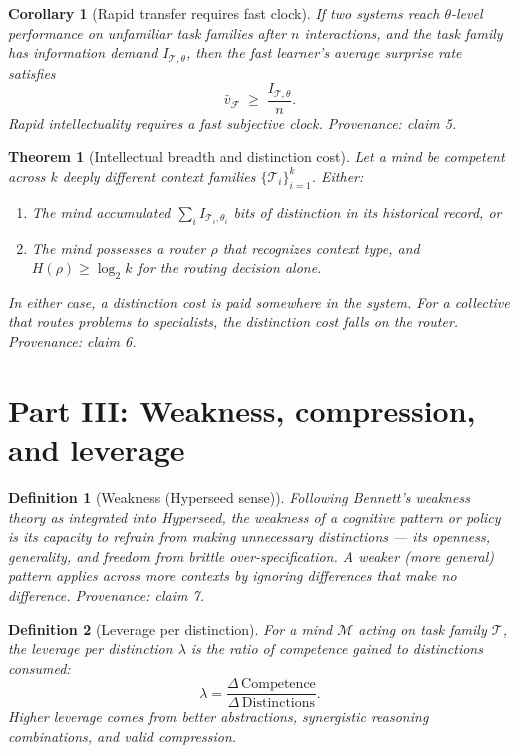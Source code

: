 \documentclass[11pt]{article}
\newtheorem{definition}{Definition}
\newtheorem{theorem}{Theorem}
\newtheorem{corollary}{Corollary}
\begin{document}
\begin{corollary}[Rapid transfer requires fast clock]
\label{cor:transfer}
If two systems reach $\theta$-level performance on unfamiliar task families after $n$ interactions, and the task family has information demand $I_{\mathcal{T},\theta}$, then the fast learner's average surprise rate satisfies
\[
  \bar{v}_{\mathcal{F}} \;\geq\; \frac{I_{\mathcal{T},\theta}}{n}.
\]
Rapid intellectuality requires a fast subjective clock.
\emph{Provenance: claim 5.}
\end{corollary}

\begin{theorem}[Intellectual breadth and distinction cost]
\label{thm:breadth}
Let a mind be competent across $k$ deeply different context families $\{\mathcal{T}_i\}_{i=1}^k$. Either:
\begin{enumerate}
  \item[(a)] The mind accumulated $\sum_i I_{\mathcal{T}_i,\theta_i}$ bits of distinction in its historical record, or
  \item[(b)] The mind possesses a router $\rho$ that recognizes context type, and $H(\rho) \geq \log_2 k$ for the routing decision alone.
\end{enumerate}
In either case, a distinction cost is paid somewhere in the system. For a collective that routes problems to specialists, the distinction cost falls on the router.
\emph{Provenance: claim 6.}
\end{theorem}

\section{Part III: Weakness, compression, and leverage}

\begin{definition}[Weakness (Hyperseed sense)]
\label{def:weakness}
Following Bennett's weakness theory as integrated into Hyperseed, the \emph{weakness} of a cognitive pattern or policy is its capacity to refrain from making unnecessary distinctions --- its openness, generality, and freedom from brittle over-specification. A weaker (more general) pattern applies across more contexts by ignoring differences that make no difference.
\emph{Provenance: claim 7.}
\end{definition}

\begin{definition}[Leverage per distinction]
\label{def:leverage}
For a mind $\mathcal{M}$ acting on task family $\mathcal{T}$, the \emph{leverage per distinction} $\lambda$ is the ratio of competence gained to distinctions consumed:
\[
  \lambda = \frac{\Delta\,\mathrm{Competence}}{\Delta\,\mathrm{Distinctions}}.
\]
Higher leverage comes from better abstractions, synergistic reasoning combinations, and valid compression.
\end{definition}
\end{document}
